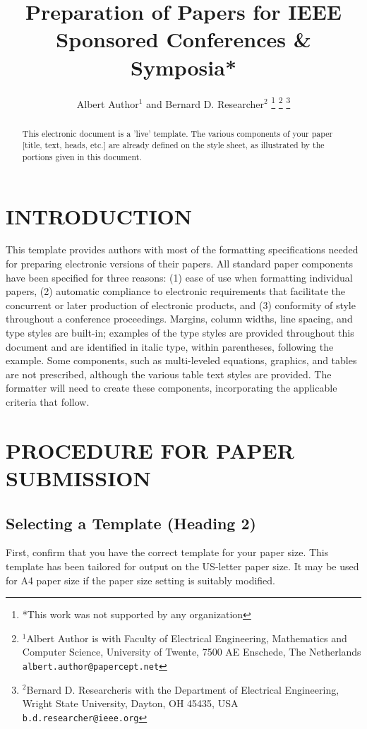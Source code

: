\documentclass[letterpaper, 10 pt, conference]{ieeeconf}  %
\title{\LARGE \bf
Preparation of Papers for IEEE Sponsored Conferences \& Symposia*
}
\author{Albert Author$^{1}$ and Bernard D. Researcher$^{2}$%
\thanks{*This work was not supported by any organization}%
\thanks{$^{1}$Albert Author is with Faculty of Electrical Engineering, Mathematics and Computer Science,
        University of Twente, 7500 AE Enschede, The Netherlands
        {\tt\small albert.author@papercept.net}}%
\thanks{$^{2}$Bernard D. Researcheris with the Department of Electrical Engineering, Wright State University,
        Dayton, OH 45435, USA
        {\tt\small b.d.researcher@ieee.org}}%
}
\begin{document}
\maketitle
\thispagestyle{empty}
\pagestyle{empty}


\begin{abstract}

This electronic document is a 'live' template. The various components of your paper [title, text, heads, etc.] are already defined on the style sheet, as illustrated by the portions given in this document.

\end{abstract}


\section{INTRODUCTION}

This template provides authors with most of the formatting specifications needed for preparing electronic versions of their papers. All standard paper components have been specified for three reasons: (1) ease of use when formatting individual papers, (2) automatic compliance to electronic requirements that facilitate the concurrent or later production of electronic products, and (3) conformity of style throughout a conference proceedings. Margins, column widths, line spacing, and type styles are built-in; examples of the type styles are provided throughout this document and are identified in italic type, within parentheses, following the example. Some components, such as multi-leveled equations, graphics, and tables are not prescribed, although the various table text styles are provided. The formatter will need to create these components, incorporating the applicable criteria that follow.

\section{PROCEDURE FOR PAPER SUBMISSION}

\subsection{Selecting a Template (Heading 2)}

First, confirm that you have the correct template for your paper size. This template has been tailored for output on the US-letter paper size. 
It may be used for A4 paper size if the paper size setting is suitably modified.
\end{document}
